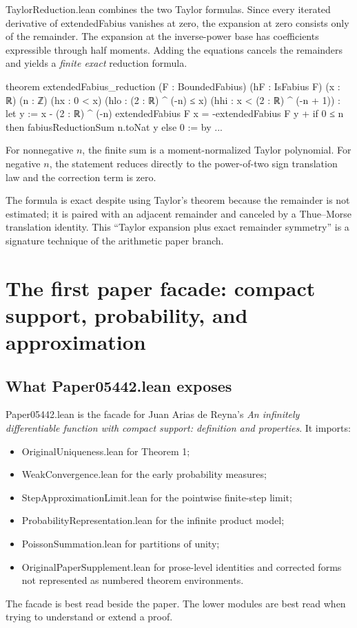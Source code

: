 \documentclass[11pt,a4paper,openany]{book}
\def\module#1{#1.lean}
\def\decl#1{#1}
\newcommand{\module}[1]{\nolinkurl{#1.lean}}
\newcommand{\decl}[1]{\texttt{\detokenize{#1}}}
\begin{document}
\module{TaylorReduction} combines the two Taylor formulas.  Since every
iterated derivative of \decl{extendedFabius} vanishes at zero, the expansion at
zero consists only of the remainder.  The expansion at the inverse-power base
has coefficients expressible through half moments.  Adding the equations
cancels the remainders and yields a \emph{finite exact} reduction formula.

\begin{LeanCode}
theorem extendedFabius_reduction
    (F : BoundedFabius) (hF : IsFabius F)
    (x : ℝ) (n : ℤ)
    (hx : 0 < x)
    (hlo : (2 : ℝ) ^ (-n) ≤ x)
    (hhi : x < (2 : ℝ) ^ (-n + 1)) :
    let y := x - (2 : ℝ) ^ (-n)
    extendedFabius F x = -extendedFabius F y +
      if 0 ≤ n then fabiusReductionSum n.toNat y else 0 := by
  ...
\end{LeanCode}

For nonnegative $n$, the finite sum is a moment-normalized Taylor polynomial.
For negative $n$, the statement reduces directly to the power-of-two sign
translation law and the correction term is zero.

\begin{proofidea}
The formula is exact despite using Taylor's theorem because the remainder is
not estimated; it is paired with an adjacent remainder and canceled by a
Thue--Morse translation identity.  This “Taylor expansion plus exact remainder
symmetry” is a signature technique of the arithmetic paper branch.
\end{proofidea}

\chapter{The first paper facade: compact support, probability, and approximation}
\label{ch:paper05442}

\section{What \module{Paper05442} exposes}
\module{Paper05442} is the facade for Juan Arias de Reyna's
\emph{An infinitely differentiable function with compact support: definition
and properties}.  It imports:
\begin{itemize}
  \item \module{OriginalUniqueness} for Theorem 1;
  \item \module{WeakConvergence} for the early probability measures;
  \item \module{StepApproximationLimit} for the pointwise finite-step limit;
  \item \module{ProbabilityRepresentation} for the infinite product model;
  \item \module{PoissonSummation} for partitions of unity;
  \item \module{OriginalPaperSupplement} for prose-level identities and
        corrected forms not represented as numbered theorem environments.
\end{itemize}
The facade is best read beside the paper.  The lower modules are best read when
trying to understand or extend a proof.
\end{document}
